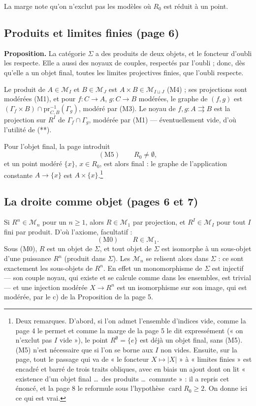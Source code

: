 \documentclass[11pt,a4paper]{article}
\begin{document}
La marge note qu'on n'exclut pas les modèles où $R_0$ est réduit à un point.

\subsection*{Produits et limites finies (page 6)}

\textbf{Proposition.} La catégorie $\Sigma$ a des produits de deux objets, et
le foncteur d'oubli les respecte. Elle a aussi des noyaux de couples, respectés
par l'oubli ; donc, dès qu'elle a un objet final, toutes les limites
projectives finies, que l'oubli respecte.

Le produit de $A \in \mathcal{M}_I$ et $B \in \mathcal{M}_J$ est $A \times B
\in \mathcal{M}_{I \sqcup J}$ (M4) ; ses projections sont modérées (M1), et
pour $f : C \to A$, $g : C \to B$ modérées, le graphe de $(f,g)$ est
$(\Gamma_f \times B) \cap \mathrm{pr}_{C,B}^{-1}(\Gamma_g)$, modéré par (M3).
Le noyau de $f, g : A \rightrightarrows B$ est la projection sur $R^I$ de
$\Gamma_f \cap \Gamma_g$, modérée par (M1) — éventuellement vide, d'où l'utilité
de (**).

Pour l'objet final, la page introduit
\[ (\mathrm{M}5) \qquad R_0 \neq \emptyset , \]
et un point modéré $\{x\}$, $x \in R_0$, est alors final : le graphe de
l'application constante $A \to \{x\}$ est $A \times \{x\}$.\footnote{Deux
remarques. D'abord, si l'on admet l'ensemble d'indices vide, comme la page 4
le permet et comme la marge de la page 5 le dit expressément (« on n'exclut
pas $I$ vide »), le point $R^\emptyset = \{e\}$ est déjà un objet final, sans
(M5). (M5) n'est nécessaire que si l'on se borne aux $I$ non vides. Ensuite,
sur la page, tout le passage qui va de « le foncteur $X \mapsto |X|$ » à
« limites finies » est encadré et barré de trois traits obliques, avec en
biais un ajout dont on lit « existence d'un objet final \ldots\ des produits
\ldots\ commute » : il a repris cet énoncé, et la page 8 le reformule sous
l'hypothèse $\operatorname{card} R_0 \geqslant 2$. On donne ici ce qui est vrai.}

\subsection*{La droite comme objet (pages 6 et 7)}

Si $R^n \in \mathcal{M}_n$ pour un $n \geqslant 1$, alors $R \in
\mathcal{M}_1$ par projection, et $R^I \in \mathcal{M}_I$ pour tout $I$ fini
par produit. D'où l'axiome, facultatif :
\[ (\mathrm{M}0) \qquad R \in \mathcal{M}_1 . \]
Sous (M0), $R$ est un objet de $\Sigma$, et tout objet de $\Sigma$ est
isomorphe à un sous-objet d'une puissance $R^n$ (produit dans $\Sigma$). Les
$\mathcal{M}_n$ se relisent alors dans $\Sigma$ : ce sont exactement les
sous-objets de $R^n$. En effet un monomorphisme de $\Sigma$ est injectif — son
couple noyau, qui existe et se calcule comme dans les ensembles, est trivial —
et une injection modérée $X \to R^n$ est un isomorphisme sur son image, qui est
modérée, par le c) de la Proposition de la page 5.
\end{document}
